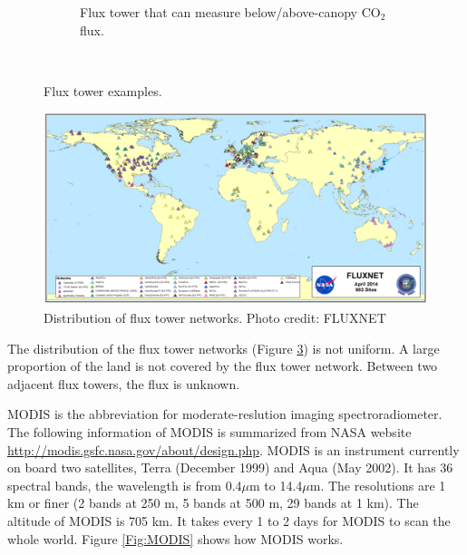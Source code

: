 \documentclass{article}
\begin{document}
\begin{figure}[!ht]
\begin{subfigure}[ht]{0.3\textwidth}
        \caption{Flux tower that can measure below/above-canopy CO$_2$ flux.}
        \label{Fig:canopy}
    \end{subfigure}
        ~ %
    \caption{Flux tower examples.}\label{Fig:fluxtowers}
\end{figure}

\begin{figure}[!ht]
\begin{center}
\includegraphics[width=13cm]{Fluxnet.png}
\caption{Distribution of flux tower networks. Photo credit: FLUXNET}
\label{Fig:Fluxnet}
\end{center}
\end{figure}

The distribution of the flux tower networks (Figure \ref{Fig:Fluxnet}) is not uniform.  A large proportion of the land is not covered by the flux tower network.  Between two adjacent flux towers, the flux is unknown. 

\smallskip

MODIS is the abbreviation for moderate-reslution imaging spectroradiometer.
The following information of MODIS is summarized from NASA website \url{http://modis.gsfc.nasa.gov/about/design.php}. MODIS is an instrument currently on board two satellites, Terra (December 1999) and Aqua (May 2002). It has 36 spectral bands, the wavelength is from 0.4$\mu$m to 14.4$\mu$m. The resolutions are 1 km or finer (2 bands at 250 m, 5 bands at 500 m, 29 bands at 1 km). The altitude of MODIS is 705 km.  It takes every 1 to 2 days for MODIS to scan the whole world.
 Figure \ref{Fig:MODIS} shows how MODIS works.
\end{document}
